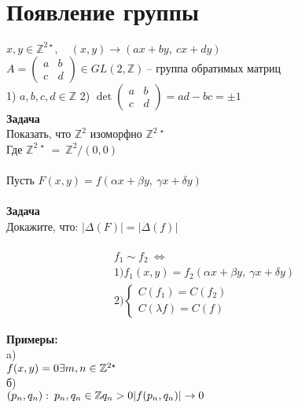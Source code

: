 \section{Появление группы}
	$x,y \in \mathbb{Z}^{2 \star}, \quad (x,y) \to (ax + by, \: cx + dy)$\\
	$A =
	\begin{pmatrix}
	a & b \\ c & d
	\end{pmatrix}
	\in GL(2, \mathbb{Z}) \ \text{-- группа обратимых матриц}$\\
	1) $a,b,c,d \in \mathbb{Z}$
	2) $\det \begin{pmatrix} a & b \\ c & d \end{pmatrix} = ad-bc = \pm 1$
	\\
	\textbf{Задача}\\
	Показать, что $\mathbb{Z}^2$ изоморфно $\mathbb{Z}^{2 \: \star}$\\
	Где $\mathbb{Z}^{2 \: \star} \ = \ \mathbb{Z}^2 / (0, 0)$\\
	\\
	Пусть $F(x,y) = f(\alpha x + \beta y,\: \gamma x + \delta y)$ \\ \\
	\textbf{Задача}\\
	Докажите, что: $|\Delta(F)| = |\Delta(f)|$\\ \\
	\begin{gather*}
	f_1 \sim f_2 \: \Leftrightarrow \\
	1) f_1(x,y) = f_2(\alpha x + \beta y,\: \gamma x + \delta y)\\
	2) 
		\begin{cases} 
			C(f_1) = C(f_2)\\
			C(\lambda f) = C(f)
		\end{cases}
	\end{gather*}
	
	\textbf{Примеры:}\\
	a)\\
	$f(x,y) = 0 \\
	\exists m,n \in \mathbb{Z}^{2 \star}$\\
	б)\\
	$(p_n, q_n): \: p_n,q_n \in \mathbb{Z}\\
	q_n > 0\\
	|f(p_n, q_n)| \to 0$
	\\

